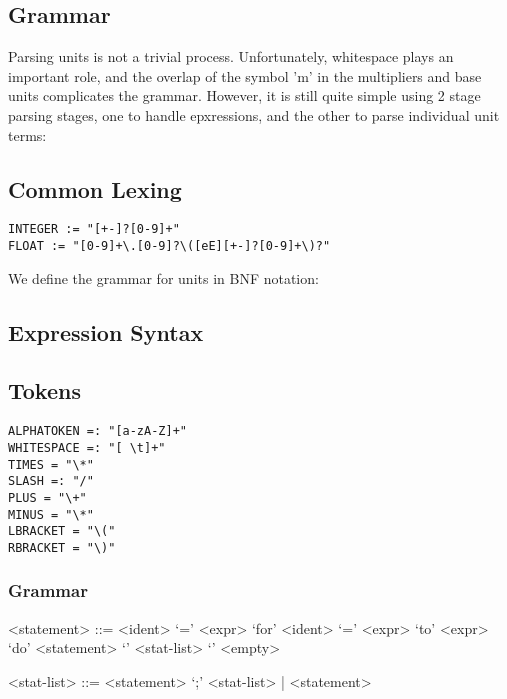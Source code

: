 \documentclass{article}
\begin{document}
\newpage
\subsection*{Grammar}

Parsing units is not a trivial process. Unfortunately, whitespace plays an important role, and the overlap of the symbol 'm' in the multipliers and base units complicates the grammar. However, it is still quite simple using  2 stage parsing stages, one to handle epxressions, and the other to parse individual unit terms:


\subsection*{Common Lexing}

\begin{verbatim}
INTEGER := "[+-]?[0-9]+"
FLOAT := "[0-9]+\.[0-9]?\([eE][+-]?[0-9]+\)?"
\end{verbatim}

We define the grammar for units in BNF notation:

\subsection*{Expression Syntax}
\subsection*{Tokens}
\begin{verbatim}
ALPHATOKEN =: "[a-zA-Z]+"
WHITESPACE =: "[ \t]+"
TIMES = "\*"
SLASH =: "/"
PLUS = "\+"
MINUS = "\*"
LBRACKET = "\("
RBRACKET = "\)"
\end{verbatim}

\setlength{\grammarparsep}{20pt plus 1pt minus 1pt} %
\setlength{\grammarindent}{12em} %

\subsubsection*{Grammar}

\begin{grammar}

<statement> ::= <ident> `=' <expr> 
\alt `for' <ident> `=' <expr> `to' <expr> `do' <statement> 
\alt `{' <stat-list> `}' 
\alt <empty> 

<stat-list> ::= <statement> `;' <stat-list> | <statement> 

\end{grammar}
\end{document}
